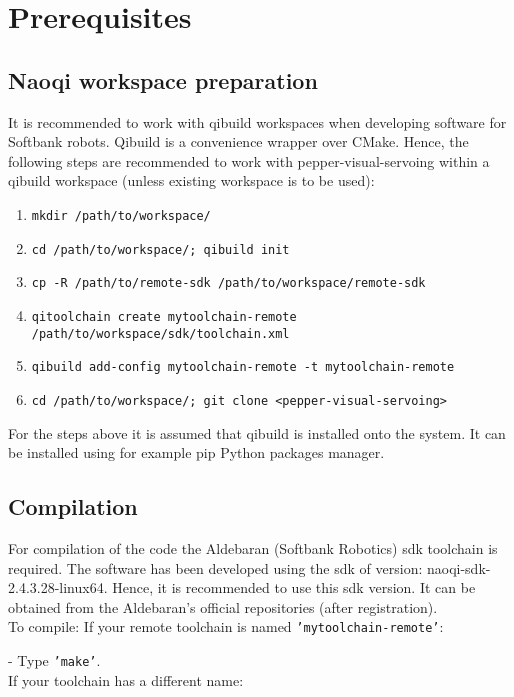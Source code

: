 \section{Prerequisites}
\subsection{Naoqi workspace preparation}
\noindent It is recommended to work with qibuild workspaces when developing software for Softbank robots. Qibuild is a
convenience wrapper over CMake. Hence, the following steps are recommended
to work with pepper-visual-servoing within a qibuild workspace (unless existing workspace is to be used):

\begin{enumerate}
\item \texttt{mkdir /path/to/workspace/}
\item \texttt{cd /path/to/workspace/; qibuild init}
\item \texttt{cp -R /path/to/remote-sdk /path/to/workspace/remote-sdk}
\item \texttt{qitoolchain create mytoolchain-remote /path/to/workspace/sdk/toolchain.xml}
\item \texttt{qibuild add-config mytoolchain-remote -t mytoolchain-remote}
\item \texttt{cd /path/to/workspace/; git clone <pepper-visual-servoing>}
\end{enumerate}

\noindent For the steps above it is assumed that qibuild is installed onto the system. It can be installed using for example pip
Python packages manager.

\subsection{Compilation}
\noindent For compilation of the code the Aldebaran (Softbank Robotics) sdk toolchain is required. The
software has been developed using the sdk of version: naoqi-sdk-2.4.3.28-linux64. Hence, it is recommended to use
this sdk version. It can be obtained from the Aldebaran's official repositories (after registration).\\

\noindent To compile:
\noindent If your remote toolchain is named \texttt{'mytoolchain-remote'}:

- Type \texttt{'make'}.\\

\noindent If your toolchain has a different name:

